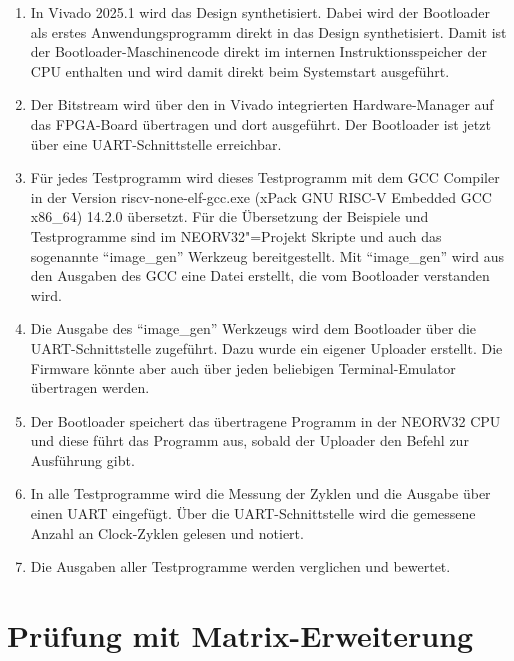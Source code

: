 \begin{enumerate}

    \item In Vivado 2025.1 wird das Design synthetisiert. Dabei wird der Bootloader als erstes Anwendungsprogramm direkt in das Design synthetisiert. Damit ist der Bootloader-Maschinencode direkt im internen Instruktionsspeicher der CPU enthalten und wird damit direkt beim Systemstart ausgeführt.

    \item Der Bitstream wird über den in Vivado integrierten Hardware-Manager auf das FPGA-Board übertragen und dort ausgeführt. Der Bootloader ist jetzt über eine UART-Schnittstelle erreichbar.

    \item Für jedes Testprogramm wird dieses Testprogramm mit dem GCC Compiler in der Version riscv-none-elf-gcc.exe (xPack GNU RISC-V Embedded GCC x86\_64) 14.2.0 übersetzt. Für die Übersetzung der Beispiele und Testprogramme sind im NEORV32"=Projekt Skripte und auch das sogenannte ``image\_gen'' Werkzeug bereitgestellt. Mit ``image\_gen'' wird aus den Ausgaben des GCC eine Datei erstellt, die vom Bootloader verstanden wird.

    \item Die Ausgabe des ``image\_gen'' Werkzeugs wird dem Bootloader über die UART-Schnittstelle zugeführt. Dazu wurde ein eigener Uploader erstellt. Die Firmware könnte aber auch über jeden beliebigen Terminal-Emulator übertragen werden.

    \item Der Bootloader speichert das übertragene Programm in der NEORV32 CPU und diese führt das Programm aus, sobald der Uploader den Befehl zur Ausführung gibt.

    \item In alle Testprogramme wird die Messung der Zyklen und die Ausgabe über einen UART eingefügt. Über die UART-Schnittstelle wird die gemessene Anzahl an Clock-Zyklen gelesen und notiert.

    \item Die Ausgaben aller Testprogramme werden verglichen und bewertet.

\end{enumerate}




\section{Prüfung mit Matrix-Erweiterung} \label{sec:eval_with_matrix_extension}

